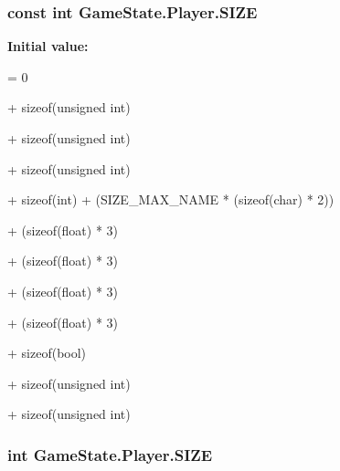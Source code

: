 \hypertarget{struct_game_state_1_1_player_a07b452f69128e1f3f6d3bb575c2976f1}{
\subsubsection[{S\-I\-Z\-E}]{\setlength{\rightskip}{0pt plus 5cm}const int Game\-State.\-Player.\-S\-I\-Z\-E\hspace{0.3cm}{\ttfamily [static]}}}\label{struct_game_state_1_1_player_a07b452f69128e1f3f6d3bb575c2976f1}
{\bfseries Initial value\-:}
\begin{DoxyCode}
= 0
            
            + \textcolor{keyword}{sizeof}(\textcolor{keywordtype}{unsigned} int)
            
            + \textcolor{keyword}{sizeof}(\textcolor{keywordtype}{unsigned} \textcolor{keywordtype}{int})
            
            + \textcolor{keyword}{sizeof}(\textcolor{keywordtype}{unsigned} int)
            
            + \textcolor{keyword}{sizeof}(\textcolor{keywordtype}{int}) + (SIZE\_MAX\_NAME * (\textcolor{keyword}{sizeof}(char) * 2))
            
            + (\textcolor{keyword}{sizeof}(\textcolor{keywordtype}{float}) * 3)
            
            + (\textcolor{keyword}{sizeof}(\textcolor{keywordtype}{float}) * 3)
            
            + (\textcolor{keyword}{sizeof}(\textcolor{keywordtype}{float}) * 3)
            
            + (\textcolor{keyword}{sizeof}(\textcolor{keywordtype}{float}) * 3)
            
            + \textcolor{keyword}{sizeof}(\textcolor{keywordtype}{bool})
            
            + \textcolor{keyword}{sizeof}(\textcolor{keywordtype}{unsigned} int)
            
            + \textcolor{keyword}{sizeof}(\textcolor{keywordtype}{unsigned} \textcolor{keywordtype}{int})
\end{DoxyCode}
\hypertarget{struct_game_state_1_1_player_ada2d068d3d5f973f73abac805c162d17}{
\subsubsection[{S\-I\-Z\-E}]{\setlength{\rightskip}{0pt plus 5cm}int Game\-State.\-Player.\-S\-I\-Z\-E\hspace{0.3cm}{\ttfamily [static]}}}\label{struct_game_state_1_1_player_ada2d068d3d5f973f73abac805c162d17}
